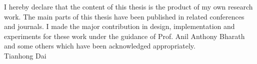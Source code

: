 
\cleardoublepage

\begin{dedication}
I hereby declare that the content of this thesis is the product of my own research work. The main parts of this thesis have been published in related conferences and journals. I made the major contribution in design, implementation and experiments for these work under the guidance of Prof. Anil Anthony Bharath and some others which have been acknowledged appropriately.\\

\hfill Tianhong Dai
\end{dedication}

